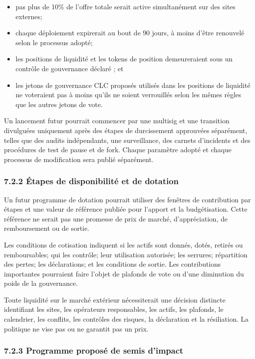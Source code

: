 \documentclass[11pt]{article}
\begin{document}
\begin{itemize}[leftmargin=*]
\item pas plus de 10\% de l'offre totale serait active simultanément sur des sites externes;
\item chaque déploiement expirerait au bout de 90 jours, à moins d'être renouvelé selon le processus adopté;
\item les positions de liquidité et les tokens de position demeureraient sous un contrôle de gouvernance déclaré ; et
\item les jetons de gouvernance CLC proposés utilisés dans les positions de liquidité ne voteraient pas à moins qu'ils ne soient verrouillés selon les mêmes règles que les autres jetons de vote.
\end{itemize}
Un lancement futur pourrait commencer par une multisig et une transition divulguées uniquement après des étapes de durcissement approuvées séparément, telles que des audits indépendants, une surveillance, des carnets d'incidents et des procédures de test de pause et de fork. Chaque paramètre adopté et chaque processus de modification sera publié séparément.

\subsubsection*{7.2.2 Étapes de disponibilité et de dotation}

Un futur programme de dotation pourrait utiliser des fenêtres de contribution par étapes et une valeur de référence publiée pour l'apport et la budgétisation. Cette référence ne serait pas une promesse de prix de marché, d'appréciation, de remboursement ou de sortie.

Les conditions de cotisation indiquent si les actifs sont donnés, dotés, retirés ou remboursables; qui les contrôle; leur utilisation autorisée; les serrures; répartition des pertes; les déclarations; et les conditions de sortie. Les contributions importantes pourraient faire l'objet de plafonds de vote ou d'une diminution du poids de la gouvernance.

Toute liquidité sur le marché extérieur nécessiterait une décision distincte identifiant les sites, les opérateurs responsables, les actifs, les plafonds, le calendrier, les conflits, les contrôles des risques, la déclaration et la résiliation. La politique ne vise pas ou ne garantit pas un prix.

\subsubsection*{7.2.3 Programme proposé de semis d'impact}
\end{document}
